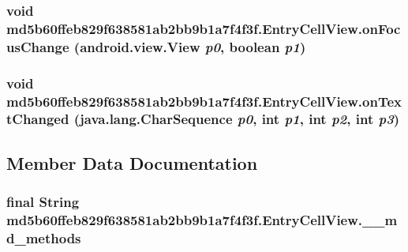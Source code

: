 \hypertarget{classmd5b60ffeb829f638581ab2bb9b1a7f4f3f_1_1_entry_cell_view_6c445e9cfc29651b0b8e0809663ab5b8}{
\subsubsection[{onFocusChange}]{\setlength{\rightskip}{0pt plus 5cm}void md5b60ffeb829f638581ab2bb9b1a7f4f3f.EntryCellView.onFocusChange (android.view.View {\em p0}, \/  boolean {\em p1})}}
\label{classmd5b60ffeb829f638581ab2bb9b1a7f4f3f_1_1_entry_cell_view_6c445e9cfc29651b0b8e0809663ab5b8}


\hypertarget{classmd5b60ffeb829f638581ab2bb9b1a7f4f3f_1_1_entry_cell_view_330adc10508be12c9c6ce3d433f4d2cf}{
\subsubsection[{onTextChanged}]{\setlength{\rightskip}{0pt plus 5cm}void md5b60ffeb829f638581ab2bb9b1a7f4f3f.EntryCellView.onTextChanged (java.lang.CharSequence {\em p0}, \/  int {\em p1}, \/  int {\em p2}, \/  int {\em p3})}}
\label{classmd5b60ffeb829f638581ab2bb9b1a7f4f3f_1_1_entry_cell_view_330adc10508be12c9c6ce3d433f4d2cf}




\subsection{Member Data Documentation}
\hypertarget{classmd5b60ffeb829f638581ab2bb9b1a7f4f3f_1_1_entry_cell_view_58b79ef4732c97fcac8b0839aabf25e6}{
\subsubsection[{\_\-\_\-md\_\-methods}]{\setlength{\rightskip}{0pt plus 5cm}final String {\bf md5b60ffeb829f638581ab2bb9b1a7f4f3f.EntryCellView.\_\-\_\-md\_\-methods}}}
\label{classmd5b60ffeb829f638581ab2bb9b1a7f4f3f_1_1_entry_cell_view_58b79ef4732c97fcac8b0839aabf25e6}


